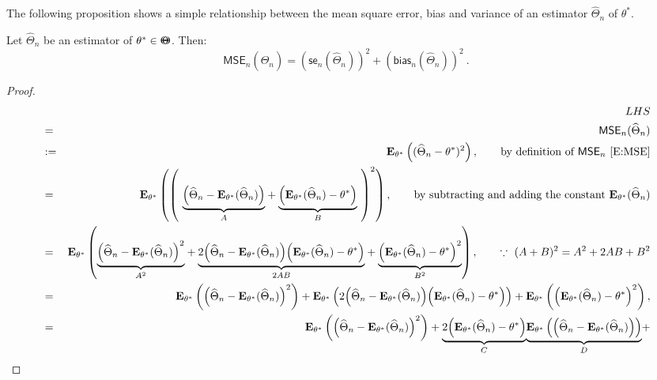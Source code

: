 The following proposition shows a simple relationship between the mean square error, bias and variance of an estimator $\widehat{\Theta}_n$ of $\theta^*$.
\begin{prop}
Let $\widehat{\Theta}_n$ be an estimator of $\theta^* \in {\Theta}\mspace{-11 mu}{\Theta}$.  Then:
\begin{equation}\label{E:RMseSeBiasTriangle}
\boxed{
\mathsf{MSE}_n(\widehat{\Theta}_n) 
= (\mathsf{se}_n(\widehat{\Theta}_n))^2 + (\mathsf{bias}_n(\widehat{\Theta}_n))^2
} \ .
\end{equation}
{\scriptsize
\begin{proof}
\begin{eqnarray}
& & LHS \notag \\
&=& \mathsf{MSE}_n(\widehat{\Theta}_n) \notag \\
&:=& \e_{\theta^*} \left((\widehat{\Theta}_n-\theta^*)^2 \right), \qquad  \text{by definition of $\mathsf{MSE}_n$ \eqref{E:MSE}} \notag \\
&=& \e_{\theta^*} \left( \left( \ \underset{A}{\underbrace{\left(\widehat{\Theta}_n -\e_{\theta^*}(\widehat{\Theta}_n) \right)}} + \underset{B}{\underbrace{\left(\e_{\theta^*}(\widehat{\Theta}_n) -\theta^* \right)}} \ \right)^2 \right), \qquad \text{by subtracting and adding the constant $\e_{\theta^*}(\widehat{\Theta}_n)$} \notag \\
&=& \e_{\theta^*} \left( \underset{A^2}{\underbrace{{\left(\widehat{\Theta}_n -\e_{\theta^*}(\widehat{\Theta}_n) \right)}^2}} + \underset{2AB}{\underbrace{2  {\left(\widehat{\Theta}_n -\e_{\theta^*}(\widehat{\Theta}_n) \right)} {\left(\e_{\theta^*}(\widehat{\Theta}_n) -\theta^* \right)}}} + \underset{B^2}{\underbrace{{\left(\e_{\theta^*}(\widehat{\Theta}_n) -\theta^* \right)}^2}}  \right), \qquad \text{$\because \ (A+B)^2=A^2+2AB+B^2$} \notag \\
&=& \e_{\theta^*} \left( {\left(\widehat{\Theta}_n -\e_{\theta^*}(\widehat{\Theta}_n) \right)}^2 \right) + 
\e_{\theta^*} \left( 2  {\left(\widehat{\Theta}_n -\e_{\theta^*}(\widehat{\Theta}_n) \right)} {\left(\e_{\theta^*}(\widehat{\Theta}_n) -\theta^* \right)} \right) + 
\e_{\theta^*} \left( {\left(\e_{\theta^*}(\widehat{\Theta}_n) -\theta^* \right)}^2  \right), %
\notag \\
&=& \e_{\theta^*} \left( {\left(\widehat{\Theta}_n -\e_{\theta^*}(\widehat{\Theta}_n) \right)}^2 \right) + 
\underset{C}{\underbrace{2 {\left(\e_{\theta^*}(\widehat{\Theta}_n) -\theta^* \right)}}} \underset{D}{\underbrace{ \e_{\theta^*} \left(  {\left(\widehat{\Theta}_n -\e_{\theta^*}(\widehat{\Theta}_n) \right)} \right)}} + 

\end{eqnarray}
\end{proof}}
\end{prop}
